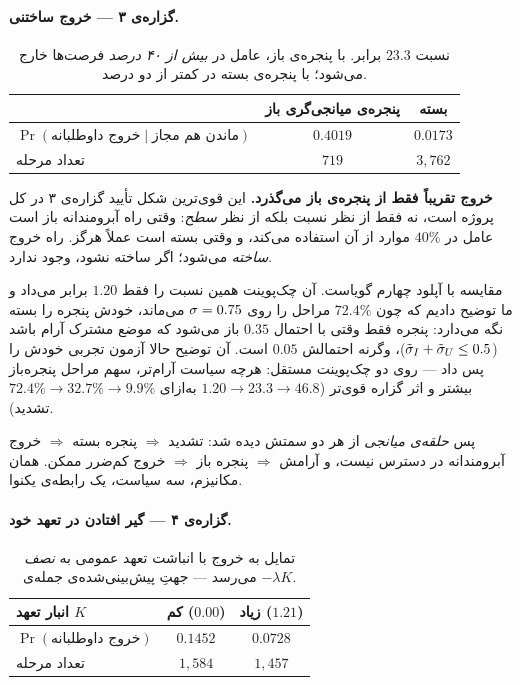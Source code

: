 \documentclass[12pt,a4paper]{article}
\begin{document}
\paragraph{گزاره‌ی ۳ — خروج ساختنی.}
\begin{table}[h]\centering
\begin{tabular}{lcc}
\toprule
 & پنجره‌ی میانجی‌گری باز & بسته\\
\midrule
$\Pr(\text{خروج داوطلبانه}\mid\text{ماندن هم مجاز})$ & $\mathbf{0.4019}$ & $0.0173$\\
تعداد مرحله & $719$ & $3{,}762$\\
\bottomrule
\end{tabular}
\caption{نسبت $\mathbf{23.3}$ برابر. با پنجره‌ی باز، عامل در
\emph{بیش از ۴۰ درصد} فرصت‌ها خارج می‌شود؛ با پنجره‌ی بسته در کمتر از
دو درصد.}
\end{table}

\begin{answer}
\textbf{خروج تقریباً فقط از پنجره‌ی باز می‌گذرد.} این قوی‌ترین شکل
تأیید گزاره‌ی ۳ در کل پروژه است، نه فقط از نظر نسبت بلکه از نظر
\emph{سطح}: وقتی راه آبرومندانه باز است عامل در $40\%$ موارد از آن
استفاده می‌کند، و وقتی بسته است عملاً هرگز. راه خروج \emph{ساخته}
می‌شود؛ اگر ساخته نشود، وجود ندارد.

مقایسه با آپلود چهارم گویاست. آن چک‌پوینت همین نسبت را فقط $1.20$ برابر
می‌داد و ما توضیح دادیم که چون $72.4\%$ مراحل را روی $\sigma=0.75$
می‌ماند، خودش پنجره را بسته نگه می‌دارد: پنجره فقط وقتی با احتمال
$0.35$ باز می‌شود که موضع مشترک آرام باشد
($\tilde{\sigma}_I+\tilde{\sigma}_U\le0.5$)، وگرنه احتمالش $0.05$ است. آن توضیح
حالا آزمون تجربی خودش را پس داد — روی دو چک‌پوینت مستقل: هرچه سیاست
آرام‌تر، سهم مراحل پنجره‌باز بیشتر و اثر گزاره قوی‌تر
($1.20 \to 23.3 \to 46.8$ به‌ازای $72.4\% \to 32.7\% \to 9.9\%$ تشدید).

پس \emph{حلقه‌ی میانجی} از هر دو سمتش دیده شد: تشدید $\Rightarrow$
پنجره بسته $\Rightarrow$ خروج آبرومندانه در دسترس نیست، و آرامش
$\Rightarrow$ پنجره باز $\Rightarrow$ خروج کم‌ضرر ممکن. همان مکانیزم،
سه سیاست، یک رابطه‌ی یکنوا.
\end{answer}

\paragraph{گزاره‌ی ۴ — گیر افتادن در تعهد خود.}
\begin{table}[h]\centering
\begin{tabular}{lcc}
\toprule
انبار تعهد $K$ & کم ($0.00$) & زیاد ($1.21$)\\
\midrule
$\Pr(\text{خروج داوطلبانه})$ & $0.1452$ & $\mathbf{0.0728}$\\
تعداد مرحله & $1{,}584$ & $1{,}457$\\
\bottomrule
\end{tabular}
\caption{تمایل به خروج با انباشت تعهد عمومی به \emph{نصف} می‌رسد —
جهتِ پیش‌بینی‌شده‌ی جمله‌ی $-\lambda K$.}
\end{table}
\end{document}
